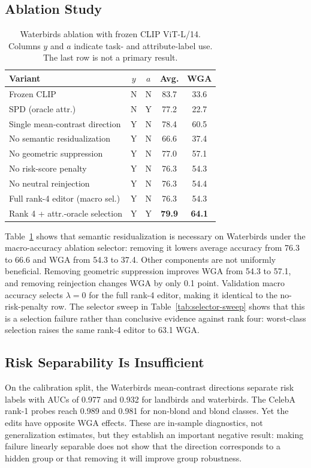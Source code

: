 \subsection{Ablation Study}
\begin{table}[t]
\centering
\caption{Waterbirds ablation with frozen CLIP ViT-L/14. Columns $y$ and $a$ indicate task- and attribute-label use. The last row is not a primary result.}
\label{tab:ablation}
\footnotesize
\setlength{\tabcolsep}{2.5pt}
\begin{tabular*}{\columnwidth}{@{\extracolsep{\fill}}lcccc@{}}
\toprule
Variant & $y$ & $a$ & Avg. & WGA \\
\midrule
Frozen CLIP & N & N & 83.7 & 33.6 \\
SPD (oracle attr.) & N & Y & 77.2 & 22.7 \\
\midrule
Single mean-contrast direction & Y & N & 78.4 & 60.5 \\
No semantic residualization & Y & N & 66.6 & 37.4 \\
No geometric suppression & Y & N & 77.0 & 57.1 \\
No risk-score penalty & Y & N & 76.3 & 54.3 \\
No neutral reinjection & Y & N & 76.3 & 54.4 \\
Full rank-4 editor (macro sel.) & Y & N & 76.3 & 54.3 \\
\midrule
Rank 4 + attr.-oracle selection & Y & Y & \textbf{79.9} & \textbf{64.1} \\
\bottomrule
\end{tabular*}
\end{table}

Table~\ref{tab:ablation} shows that semantic residualization is necessary on Waterbirds under the macro-accuracy ablation selector: removing it lowers average accuracy from 76.3 to 66.6 and WGA from 54.3 to 37.4. Other components are not uniformly beneficial. Removing geometric suppression improves WGA from 54.3 to 57.1, and removing reinjection changes WGA by only 0.1 point. Validation macro accuracy selects $\lambda=0$ for the full rank-4 editor, making it identical to the no-risk-penalty row. The selector sweep in Table~\ref{tab:selector-sweep} shows that this is a selection failure rather than conclusive evidence against rank four: worst-class selection raises the same rank-4 editor to 63.1 WGA.

\subsection{Risk Separability Is Insufficient}
On the calibration split, the Waterbirds mean-contrast directions separate risk labels with AUCs of 0.977 and 0.932 for landbirds and waterbirds. The CelebA rank-1 probes reach 0.989 and 0.981 for non-blond and blond classes. Yet the edits have opposite WGA effects. These are in-sample diagnostics, not generalization estimates, but they establish an important negative result: making failure linearly separable does not show that the direction corresponds to a hidden group or that removing it will improve group robustness.

